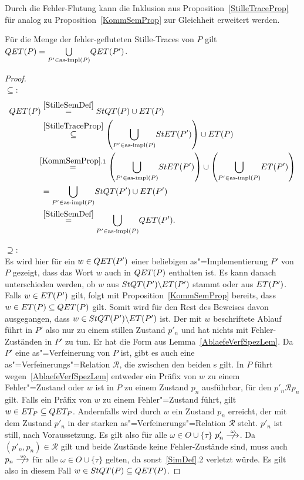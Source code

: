 Durch die Fehler-Flutung kann die Inklusion aus
Proposition~\ref{StilleTraceProp} für \QET{} analog zu
Proposition~\ref{KommSemProp} zur Gleichheit erweitert werden.

\begin{Prop}
  \label{StilleSemProp}
  Für die Menge der fehler-gefluteten Stille-Traces von $P$ gilt $QET (P) =
  \underset{P'\in\mathrm{as}\text{-}\mathrm{impl} (P)}{\bigcup} QET (P')$.
\end{Prop}
\begin{proof}\mbox{}\\
  \glqq$\subseteq$\grqq{}:
  {\allowdisplaybreaks
  \begin{align*}
    \QET (P)&\overset{\ref{StilleSemDef}}{=} \StQT (P) \cup \ET (P)\\
    &\overset{\ref{StilleTraceProp}}{\subseteq} \left(\underset{P'\in\asimp
    (P)}{\bigcup} \StET (P')\right)\cup \ET (P)\\
    &\hspace{-0.15cm}\overset{\ref{KommSemProp}.1}{=} \left(\underset{P'\in\asimp
    (P)}{\bigcup} \StET (P')\right)\cup \left(\underset{P'\in\asimp
    (P)}{\bigcup} \ET (P')\right)\\
    &= \underset{P'\in\asimp (P)}{\bigcup} \StQT (P') \cup \ET (P')\\
    &\overset{\ref{StilleSemDef}}{=} \underset{P'\in\asimp (P)}{\bigcup} \QET
    (P').
  \end{align*}}

  \glqq$\supseteq$\grqq{}:\\
  Es wird hier für ein $w\in QET (P')$ einer beliebigen as"=Implementierung
  $P'$ von $P$ gezeigt, dass das Wort $w$ auch in $QET (P)$ enthalten ist. Es
  kann danach unterschieden werden, ob $w$ aus $StQT (P')\backslash ET (P')$
  stammt oder aus $ET (P')$. Falls $w\in ET (P')$ gilt, folgt mit
  Proposition~\ref{KommSemProp} bereits, dass $w\in ET (P) \subseteq QET (P)$
  gilt. Somit wird für den Rest des Beweises davon ausgegangen, dass $w\in StQT
  (P')\backslash ET (P')$ ist. Der mit $w$ beschriftete Ablauf führt in $P'$
  also nur zu einem stillen Zustand $p'_n$ und hat nichts mit Fehler-Zuständen
  in $P'$ zu tun. Er hat die Form aus Lemma~\ref{AblaefeVerfSpezLem}. Da $P'$
  eine as"=Verfeinerung von $P$ ist, gibt es auch eine
  as"=Verfeinerungs"=Relation $\mathcal{R}$, die zwischen den beiden \MEIO{}s
  gilt. In $P$ führt wegen~\ref{AblaefeVerfSpezLem} entweder ein Präfix von $w$
  zu einem Fehler"=Zustand oder $w$ ist in $P$ zu einem Zustand $p_n$
  ausführbar, für den $p'_n \mathcal{R} p_n$ gilt. Falls ein Präfix von $w$ zu
  einem Fehler"=Zustand führt, gilt $w\in ET _P\subseteq QET _P$. Andernfalls
  wird durch $w$ ein Zustand $p_n$ erreicht, der mit dem Zustand $p'_n$ in der
  starken as"=Verfeinerungs"=Relation $\mathcal{R}$ steht. $p'_n$ ist still,
  nach Voraussetzung. Es gilt also für alle $\omega\in O\cup \{\tau\}$
  $p'_n\nmust[\omega]$. Da $(p'_n,p_n) \in\mathcal{R}$ gilt und beide Zustände
  keine Fehler-Zustände sind, muss auch $p_n\nmust[\omega]$ für alle $\omega\in
  O\cup \{\tau\}$ gelten, da sonst~\ref{SimDef}.2 verletzt würde. Es gilt also
  in diesem Fall $w\in StQT (P)\subseteq QET (P)$.
\end{proof}


